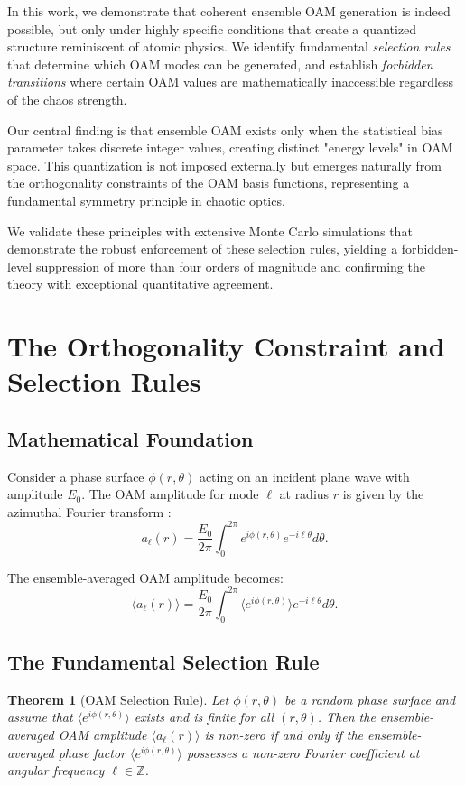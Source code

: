 \documentclass[a4paper,12pt]{article}
\newtheorem{theorem}{Theorem}[section]
\newcommand{\ev}[1]{\langle #1 \rangle}
\begin{document}
In this work, we demonstrate that coherent ensemble OAM generation is indeed possible, but only under highly 
specific conditions that create a quantized structure reminiscent of atomic physics. We identify 
fundamental \emph{selection rules} that determine which OAM modes can be generated, and establish \emph{forbidden 
transitions} where certain OAM values are mathematically inaccessible regardless of the chaos strength.

Our central finding is that ensemble OAM exists only when the statistical bias parameter takes discrete integer 
values, creating distinct "energy levels" in OAM space. This quantization is not imposed externally but emerges 
naturally from the orthogonality constraints of the OAM basis functions, representing a fundamental symmetry 
principle in chaotic optics.

We validate these principles with extensive Monte Carlo simulations that demonstrate the robust enforcement 
of these selection rules, yielding a forbidden-level suppression of more than four orders of magnitude and 
confirming the theory with exceptional quantitative agreement.

\section{The Orthogonality Constraint and Selection Rules}
\label{sec:The Orthogonality Constraint and Selection Rules}
\subsection{Mathematical Foundation}
Consider a phase surface $\phi(r,\theta)$ acting on an incident plane wave with amplitude $E_0$. The OAM amplitude for 
mode $\ell$ at radius $r$ is given by the azimuthal Fourier transform \cite{yao2011orbital}:
\begin{equation}
    a_\ell(r) = \frac{E_0}{2\pi} \int_0^{2\pi} e^{i\phi(r,\theta)} e^{-i\ell\theta} d\theta.
    \label{eq:oam_amplitude}
\end{equation}

The ensemble-averaged OAM amplitude becomes:
\begin{equation}
    \ev{a_\ell(r)} = \frac{E_0}{2\pi} \int_0^{2\pi} \ev{e^{i\phi(r,\theta)}} e^{-i\ell\theta} d\theta.
    \label{eq:ensemble_average}
\end{equation}

\subsection{The Fundamental Selection Rule}
\begin{theorem}[OAM Selection Rule]
Let $\phi(r,\theta)$ be a random phase surface and assume that $\ev{e^{i\phi(r,\theta)}}$ exists and is finite for all $(r,\theta)$. Then the ensemble-averaged OAM amplitude $\ev{a_\ell(r)}$ is non-zero if and only if the ensemble-averaged phase factor $\ev{e^{i\phi(r,\theta)}}$ possesses a non-zero Fourier coefficient at angular frequency $\ell \in \mathbb{Z}$.
\label{theorem:OAM_Selection_Rule}
\end{theorem}
\end{document}
